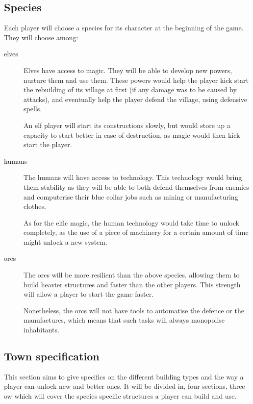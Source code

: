 \documentclass{article}
\begin{document}
\subsection{Species}
Each player will choose a species for its character at the beginning of the game.
They will choose among:
\begin{description}
	\item[elves]
	Elves have access to magic. They will be able to develop new powers, nurture
	them and use them.
	These powers would help the player kick start the rebuilding of its village at first
	(if any damage was to be caused by attacks), and eventually help the player
	defend the village, using defensive spells.

	An elf player will start its constructions slowly, but would store up a
	capacity to start better in case of destruction, as magic would then kick
	start the player.

	\item[humans]
	The humans will have access to technology. This technology would bring them stability
	as they will be able to both defend themselves from enemies and computerise their blue
	collar jobs such as mining or manufacturing clothes.

	As for the elfic magic, the human technology would take time to unlock completely,
	as the use of a piece of machinery for a certain amount of time might unlock a
	new system.

	\item[orcs]
	The orcs will be more resilient than the above species, allowing them to build
	heavier structures and faster than the other players. This strength will allow a
	player to start the game faster.

	Nonetheless, the orcs will not have tools to automatise the defence or the manufactures,
	which means that such tasks will always monopolise inhabitants.
\end{description}


\subsection{Town specification}
This section aims to give specifics on the different building types and the way a player can
unlock new and better ones. It will be divided in, four sections, three ow which will cover the
species specific structures a player can build and use.
\end{document}

